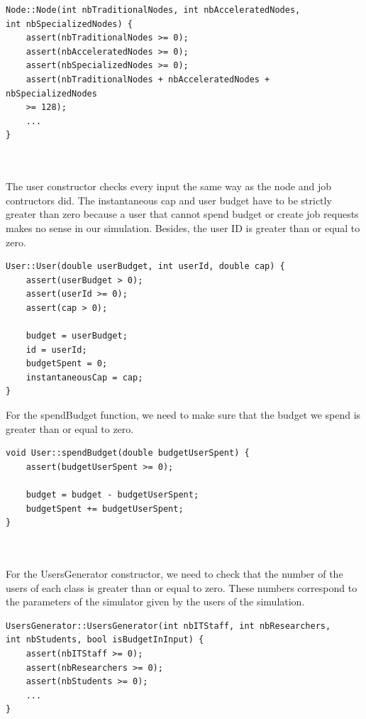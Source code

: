 \documentclass [10 pt, a4 paper]{report}
\begin{document}
\begin{lstlisting}[caption=Node constructor of the class Node, label={lst:code1}, frame=single]
Node::Node(int nbTraditionalNodes, int nbAcceleratedNodes, 
int nbSpecializedNodes) {
	assert(nbTraditionalNodes >= 0);
	assert(nbAcceleratedNodes >= 0);
	assert(nbSpecializedNodes >= 0);
	assert(nbTraditionalNodes + nbAcceleratedNodes + nbSpecializedNodes 
	>= 128);
	...
}
\end{lstlisting}

\noindent
\\ \\
The user constructor checks every input the same way as the node and job contructors did. The instantaneous cap and user budget have to be strictly greater than zero because a user that cannot spend budget or create job requests makes no sense in our simulation. Besides, the user ID is greater than or equal to zero.


\begin{lstlisting}[caption=User constructor of the class User, label={lst:code1}, frame=single]
User::User(double userBudget, int userId, double cap) {
	assert(userBudget > 0);
	assert(userId >= 0);
	assert(cap > 0);

	budget = userBudget;
	id = userId;
	budgetSpent = 0;
	instantaneousCap = cap;
}
\end{lstlisting}

\noindent
\clearpage
For the spendBudget function, we need to make sure that the budget we spend is greater than or equal to zero.


\begin{lstlisting}[caption=spendBudget function of the class User, label={lst:code1}, frame=single]
void User::spendBudget(double budgetUserSpent) {
	assert(budgetUserSpent >= 0);

	budget = budget - budgetUserSpent;
	budgetSpent += budgetUserSpent;
}
\end{lstlisting}


\noindent
\\ \\
For the UsersGenerator constructor, we need to check that the number of the users of each class is greater than or equal to zero. These numbers correspond to the parameters of the simulator given by the users of the simulation.


\begin{lstlisting}[caption=UsersGenerator constructor of the class UsersGenerator, label={lst:code1}, frame=single]
UsersGenerator::UsersGenerator(int nbITStaff, int nbResearchers, 
int nbStudents, bool isBudgetInInput) {
	assert(nbITStaff >= 0);
	assert(nbResearchers >= 0);
	assert(nbStudents >= 0);
	...
}
\end{lstlisting}
\end{document}
